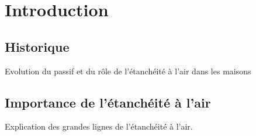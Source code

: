 
\chapter*{Introduction}  %
\ifpdf
    \graphicspath{{Chapter1/Figs/Raster/}{Chapter1/Figs/PDF/}{Chapter1/Figs/}}
\else
    \graphicspath{{Chapter1/Figs/Vector/}{Chapter1/Figs/}}
\fi


\section*{Historique}
Evolution du passif et du rôle de l'étanchéité à l'air dans les maisons

\section*{Importance de l'étanchéité à l'air}

Explication des grandes lignes de l'étanchéité à l'air.

